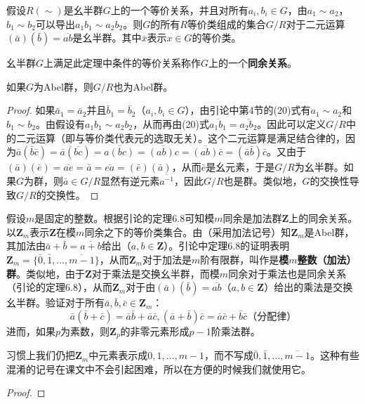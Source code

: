 \documentclass[../../main.tex]{subfiles}
\begin{document}
\begin{theorem}\label{theorem:同余关系}
假设$R(\sim)$是幺半群$G$上的一个等价关系，并且对所有$a_i, b_i \in G$，由$a_1 \sim a_2$，$b_1 \sim b_2$可以导出$a_1 b_1 \sim a_2 b_2$。则$G$的所有$R$等价类组成的集合$G/R$对于二元运算$(\bar{a})(\bar{b}) = \overline{ab}$是幺半群。其中$\bar{x}$表示$x \in G$的等价类。

幺半群$G$上满足此定理中条件的等价关系称作$G$上的一个\textbf{同余关系}。

如果$G$为Abel群，则$G/R$也为Abel群。
\end{theorem}
\begin{proof}
如果$\bar{a}_1 = \bar{a}_2$并且$\bar{b}_1 = \bar{b}_2$（$a_i, b_i \in G$），由引论中第4节的(20)式有$a_1 \sim a_2$和$b_1 \sim b_2$。由假设有$a_1 b_1 \sim a_2 b_2$，从而再由(20)式$\overline{a_1 b_1} = \overline{a_2 b_2}$。因此可以定义$G/R$中的二元运算（即与等价类代表元的选取无关）。这个二元运算是满足结合律的，因为$\bar{a} (\bar{b} \bar{c}) = \bar{a}(\overline{bc}) = \overline{a(bc)} = \overline{(ab)c} = \overline{(ab)} \bar{c} = (\bar{a} \bar{b})\bar{c}$。又由于$(\bar{a})(\bar{e}) = \overline{ae} = \bar{a} = \overline{ea} = (\bar{e})(\bar{a})$，从而$\bar{e}$是幺元素，于是$G/R$为幺半群。如果$G$为群，则$\bar{a} \in G/R$显然有逆元素$\overline{a^{-1}}$，因此$G/R$也是群。类似地，$G$的交换性导致$G/R$的交换性。

\end{proof}

\begin{example}
假设$m$是固定的整数。根据引论的定理6.8可知模$m$同余是加法群$\boldsymbol{Z}$上的同余关系。以$\boldsymbol{Z}_m$表示$\boldsymbol{Z}$在模$m$同余之下的等价类集合。由（采用加法记号）知$\boldsymbol{Z}_m$是Abel群，其加法由$\bar{a} + \bar{b} = \overline{a + b}$给出（$a, b \in \boldsymbol{Z}$）。引论中定理6.8的证明表明$\boldsymbol{Z}_m = \{ \bar{0}, \bar{1}, \dots, \overline{m - 1} \}$，从而$\boldsymbol{Z}_m$对于加法是$m$阶有限群，叫作是\textbf{模$m$整数（加法）群}。类似地，由于$\boldsymbol{Z}$对于乘法是交换幺半群，而模$m$同余对于乘法也是同余关系（引论的定理6.8），从而$\boldsymbol{Z}_m$对于由$(\bar{a})(\bar{b}) = \overline{ab}$（$a, b \in \boldsymbol{Z}$）给出的乘法是交换幺半群。验证对于所有$\bar{a}, \bar{b}, \bar{c} \in \boldsymbol{Z}_m$：
\[\bar{a}(\bar{b} + \bar{c}) = \bar{a}\bar{b} + \bar{a}\bar{c}, (\bar{a} + \bar{b})\bar{c} = \bar{a}\bar{c} + \bar{b}\bar{c} \text{（分配律）}\]
进而，如果$p$为素数，则$\boldsymbol{Z}_p$的非零元素形成$p - 1$阶乘法群。
\end{example}
\begin{remark}
习惯上我们仍把$\boldsymbol{Z}_m$中元素表示成$0, 1, \dots, m - 1$，而不写成$\bar{0}, \bar{1}, \dots, \overline{m - 1}$。这种有些混淆的记号在课文中不会引起困难，所以在方便的时候我们就使用它。
\end{remark}
\begin{proof}


\end{proof}
\end{document}
